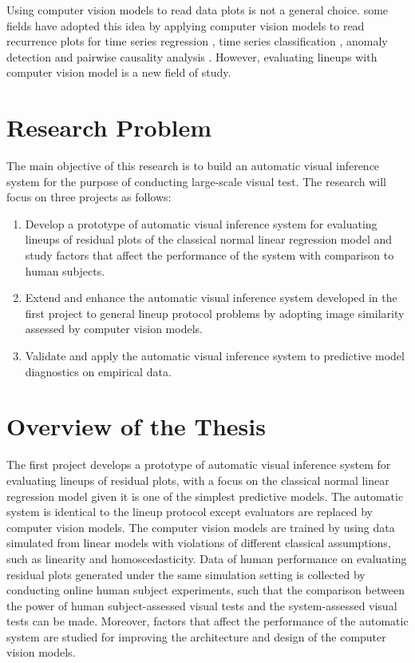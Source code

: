\documentclass{monashthesis}
\theoremstyle{definition}
\theoremstyle{definition}
\theoremstyle{definition}
\theoremstyle{definition}
\theoremstyle{remark}
\begin{document}
Using computer vision models to read data plots is not a general choice. some fields have adopted this idea by applying computer vision models to read recurrence plots for time series regression \autocite{ojeda_multivariate_2020}, time series classification \autocite{chu_automatic_2019,hailesilassie_financial_2019,hatami_classification_2018,zhang_encoding_2020}, anomaly detection \autocite{chen_convolutional_2020} and pairwise causality analysis \autocite{singh_deep_2017}. However, evaluating lineups with computer vision model is a new field of study.

\hypertarget{research-problem}{%
\chapter{Research Problem}\label{research-problem}}

The main objective of this research is to build an automatic visual inference system for the purpose of conducting large-scale visual test. The research will focus on three projects as follows:

\begin{enumerate}
\def\labelenumi{\arabic{enumi}.}
\item
  Develop a prototype of automatic visual inference system for evaluating lineups of residual plots of the classical normal linear regression model and study factors that affect the performance of the system with comparison to human subjects.
\item
  Extend and enhance the automatic visual inference system developed in the first project to general lineup protocol problems by adopting image similarity assessed by computer vision models.
\item
  Validate and apply the automatic visual inference system to predictive model diagnostics on empirical data.
\end{enumerate}

\hypertarget{overview-of-the-thesis}{%
\chapter{Overview of the Thesis}\label{overview-of-the-thesis}}

The first project develops a prototype of automatic visual inference system for evaluating lineups of residual plots, with a focus on the classical normal linear regression model given it is one of the simplest predictive models. The automatic system is identical to the lineup protocol except evaluators are replaced by computer vision models. The computer vision models are trained by using data simulated from linear models with violations of different classical assumptions, such as linearity and homoscedasticity. Data of human performance on evaluating residual plots generated under the same simulation setting is collected by conducting online human subject experiments, such that the comparison between the power of human subject-assessed visual tests and the system-assessed visual tests can be made. Moreover, factors that affect the performance of the automatic system are studied for improving the architecture and design of the computer vision models.
\end{document}
